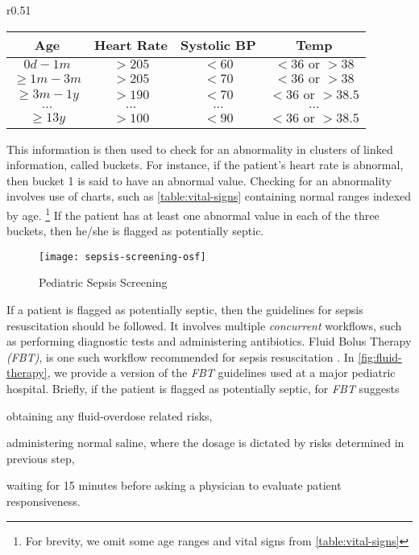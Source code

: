 \begin{wraptable}{r}{0.51\textwidth}
  \footnotesize
  \begin{tabular}{ | c || c | c | c | }
    \hline
    \textbf{Age}            & \textbf{Heart Rate}   & \textbf{Systolic BP} & \textbf{Temp}  \\
    \hline
    $0d - 1m$               & $>205$                & $<60$                & $<36 \text{ or } >38$ \\
    \hline
    $\geq 1m - 3m$          & $>205$                & $<70$                & $<36 \text{ or } >38$ \\
    \hline
    $\geq 3m - 1y$          & $>190$                & $<70$                & $<36 \text{ or } >38.5$ \\
    \hline
    $\dots$                 & $\dots$               & $\dots$              & $\dots$ \\
    \hline
    $\geq 13y$              & $>100$                & $<90$                & $<36 \text{ or } >38.5$ \\
    \hline
  \end{tabular}
  \caption{Vital Signs Chart}\label{table:vital-signs}
\end{wraptable}

This information is then used to check for an abnormality
in clusters of linked information, called buckets. For instance, if
the patient's heart rate is abnormal, then bucket 1 is said to
have an abnormal value.
Checking for an abnormality involves use of charts,
such as \tablename{} \ref{table:vital-signs} containing normal ranges indexed by age.
\footnote{For brevity, we omit some age ranges and vital signs from \tablename{} \ref{table:vital-signs}}
If the patient has at least one abnormal value in each of the three buckets,
then he/she is flagged as potentially septic.

\begin{figure}[h]
  \centering
    \texttt{[image: sepsis-screening-osf]}
    \caption{Pediatric Sepsis Screening}\label{fig:sepsis-screening}
\end{figure}

If a patient is flagged as potentially septic, then the guidelines for
sepsis resuscitation should be followed.
It involves multiple \emph{concurrent} workflows, such as
performing diagnostic tests and administering antibiotics.
Fluid Bolus Therapy \emph{(FBT)}, is one such workflow
recommended for sepsis resuscitation \cite{Carcillo2002CCM}. In \figurename
\ref{fig:fluid-therapy}, we provide a version of the \emph{FBT} guidelines used at a
major pediatric hospital. Briefly, if the patient is flagged as
potentially septic, \BPG{} for \emph{FBT} suggests
\begin{enumerate*}[label=(\alph*)]
  \item obtaining any fluid-overdose related risks,
  \item administering normal saline, where the dosage is dictated
    by risks determined in previous step,
  \item waiting for 15 minutes before asking a physician to
    evaluate patient responsiveness.
\end{enumerate*}

